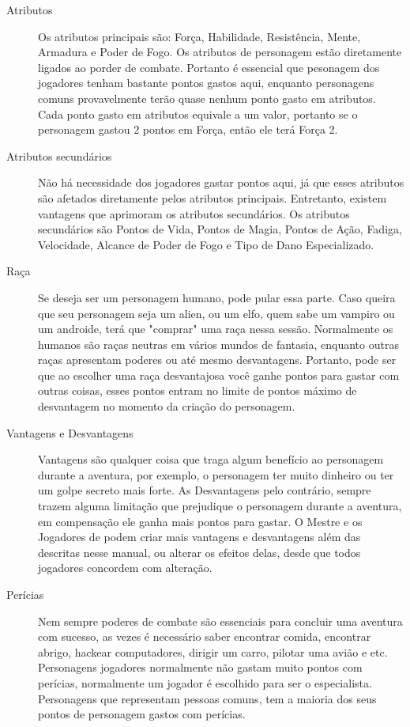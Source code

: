\begin{description}

\item[Atributos] Os atributos principais são: Força, Habilidade, Resistência, Mente, Armadura e Poder de Fogo. Os atributos de personagem estão diretamente ligados ao porder de combate. Portanto é essencial que pesonagem dos jogadores tenham bastante pontos gastos aqui, enquanto personagens comuns provavelmente terão quase nenhum ponto gasto em atributos. Cada ponto gasto em atributos equivale a um valor, portanto se o personagem gastou 2 pontos em Força, então ele terá Força 2.

\item[Atributos secundários] Não há necessidade dos jogadores gastar pontos aqui, já que esses atributos são afetados diretamente pelos atributos principais. Entretanto, existem vantagens que aprimoram os atributos secundários. Os atributos secundários são Pontos de Vida, Pontos de Magia, Pontos de Ação, Fadiga, Velocidade, Alcance de Poder de Fogo e Tipo de Dano Especializado.

\item[Raça] Se deseja ser um personagem humano, pode pular essa parte. Caso queira que seu personagem seja um alien, ou um elfo, quem sabe um vampiro ou um androide, terá que "comprar" uma raça nessa sessão. Normalmente os humanos são raças neutras em vários mundos de fantasia, enquanto outras raças apresentam poderes ou até mesmo desvantagens. Portanto, pode ser que ao escolher uma raça desvantajosa você ganhe pontos para gastar com outras coisas, esses pontos entram no limite de pontos máximo de desvantagem no momento da criação do personagem.

\item[Vantagens e Desvantagens] Vantagens são qualquer coisa que traga algum benefício ao personagem durante a aventura, por exemplo, o personagem ter muito dinheiro ou ter um golpe secreto mais forte. As Desvantagens pelo contrário, sempre trazem alguma limitação que prejudique o personagem durante a aventura, em compensação ele ganha mais pontos para gastar. O Mestre e os Jogadores de podem criar mais vantagens e desvantagens além das descritas nesse manual, ou alterar os efeitos delas, desde que todos jogadores concordem com alteração.

\item[Perícias] Nem sempre poderes de combate são essenciais para concluir uma aventura com sucesso, as vezes é necessário saber encontrar comida, encontrar abrigo, hackear computadores, dirigir um carro, pilotar uma avião e etc. Personagens jogadores normalmente não gastam muito pontos com perícias, normalmente um jogador é escolhido para ser o especialista. Personagens que representam pessoas comuns, tem a maioria dos seus pontos de personagem gastos com perícias.


\end{description}
